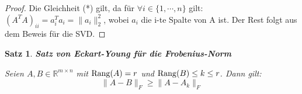 \documentclass{article}
\newcommand{\R}[0]{\mathbb{R}}
\newtheorem{thm}{Satz}
\begin{document}
\begin{proof}
    Die Gleichheit (*) gilt, da für $\forall i\in \{1, \cdots, n\}$ gilt: $(A^TA)_{ii} = a_i^Ta_i = \lVert a_i \rVert^2_2$, wobei $a_i$ die i-te Spalte von A ist.
    Der Rest folgt aus dem Beweis für die SVD.
\end{proof}

\begin{thm} \textbf{Satz von Eckart-Young für die Frobenius-Norm}

    Seien $A, B \in \R^{m \times n}$ mit ${\rm Rang}(A) = r$ und ${\rm Rang}(B) \leq k \leq r$. Dann gilt:
    \begin{equation}
        \lVert A - B \rVert_F \geq \lVert A - A_k \rVert_F
    \end{equation}
\end{thm}
\end{document}

